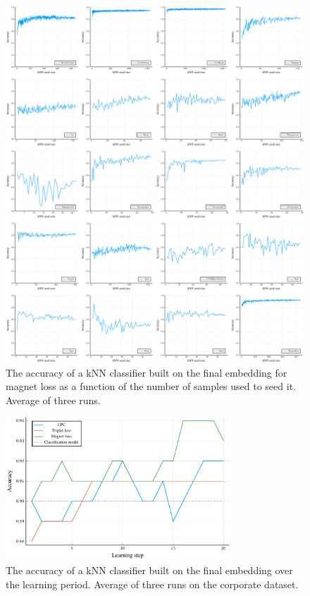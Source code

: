 \begin{figure}
  \centering
  \includegraphics[width=\textwidth]{images/magnet-toy/kNN/magnet-toy-kNN.pdf}
  \caption{The accuracy of a kNN classifier built on the final embedding for magnet loss as a function of the number of samples used to seed it. Average of three runs.}\label{fig:magnet-toy-kNN}
\end{figure}

\begin{figure}
  \centering
  \includegraphics[width=0.75\textwidth]{images/cisco/accuracy/cisco-accuracy.pdf}
  \caption{The accuracy of a kNN classifier built on the final embedding over the learning period. Average of three runs on the corporate dataset.}\label{fig:cisco-accuracy}
\end{figure}

